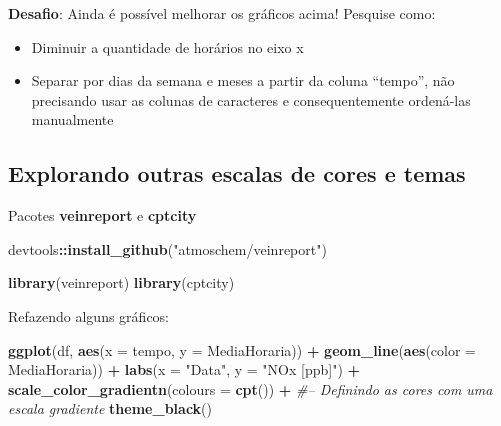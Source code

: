 \documentclass[]{book}
\newenvironment{Shaded}{\begin{snugshade}}{\end{snugshade}}
\newcommand{\KeywordTok}[1]{\textcolor[rgb]{0.13,0.29,0.53}{\textbf{#1}}}
\newcommand{\DataTypeTok}[1]{\textcolor[rgb]{0.13,0.29,0.53}{#1}}
\newcommand{\StringTok}[1]{\textcolor[rgb]{0.31,0.60,0.02}{#1}}
\newcommand{\CommentTok}[1]{\textcolor[rgb]{0.56,0.35,0.01}{\textit{#1}}}
\newcommand{\OperatorTok}[1]{\textcolor[rgb]{0.81,0.36,0.00}{\textbf{#1}}}
\newcommand{\NormalTok}[1]{#1}
\providecommand{\tightlist}{%
  \setlength{\itemsep}{0pt}\setlength{\parskip}{0pt}}
\begin{document}
\textbf{Desafio}: Ainda é possível melhorar os gráficos acima! Pesquise
como:

\begin{itemize}
\tightlist
\item
  Diminuir a quantidade de horários no eixo x\\
\item
  Separar por dias da semana e meses a partir da coluna ``tempo'', não
  precisando usar as colunas de caracteres e consequentemente ordená-las
  manualmente
\end{itemize}

\subsection{Explorando outras escalas de cores e
temas}\label{explorando-outras-escalas-de-cores-e-temas}

Pacotes \textbf{veinreport} e \textbf{cptcity}

\begin{Shaded}
\begin{Highlighting}[]
\NormalTok{devtools}\OperatorTok{::}\KeywordTok{install_github}\NormalTok{(}\StringTok{"atmoschem/veinreport"}\NormalTok{)}
\end{Highlighting}
\end{Shaded}

\begin{Shaded}
\begin{Highlighting}[]
\KeywordTok{library}\NormalTok{(veinreport)}
\KeywordTok{library}\NormalTok{(cptcity)}
\end{Highlighting}
\end{Shaded}

Refazendo alguns gráficos:

\begin{Shaded}
\begin{Highlighting}[]
\KeywordTok{ggplot}\NormalTok{(df, }\KeywordTok{aes}\NormalTok{(}\DataTypeTok{x =}\NormalTok{ tempo, }\DataTypeTok{y =}\NormalTok{ MediaHoraria)) }\OperatorTok{+}\StringTok{ }
\StringTok{  }\KeywordTok{geom_line}\NormalTok{(}\KeywordTok{aes}\NormalTok{(}\DataTypeTok{color =}\NormalTok{ MediaHoraria)) }\OperatorTok{+}
\StringTok{  }\KeywordTok{labs}\NormalTok{(}\DataTypeTok{x =} \StringTok{"Data"}\NormalTok{, }\DataTypeTok{y =} \StringTok{"NOx [ppb]"}\NormalTok{) }\OperatorTok{+}
\StringTok{  }\KeywordTok{scale_color_gradientn}\NormalTok{(}\DataTypeTok{colours =} \KeywordTok{cpt}\NormalTok{()) }\OperatorTok{+}\StringTok{ }\CommentTok{#-- Definindo as cores com uma escala gradiente}
\StringTok{  }\KeywordTok{theme_black}\NormalTok{()}
\end{Highlighting}
\end{Shaded}
\end{document}
